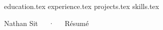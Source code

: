 \documentclass{awesome-cv}
\newcommand*{\sectiondir}{resume/}
\begin{document}
\begin{center}
\makecvheader
\end{center}

{education.tex}
{experience.tex}
{projects.tex}
{skills.tex}

\makecvfooter
  {}
  {Nathan Sit~~~·~~~Résumé}
  {}
\end{document}
